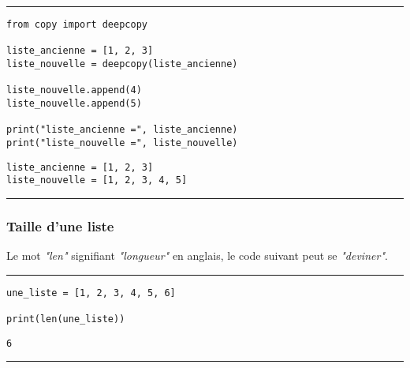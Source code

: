 \bigskip
{\hrule height .5mm}
\begin{verbatim}
from copy import deepcopy

liste_ancienne = [1, 2, 3]
liste_nouvelle = deepcopy(liste_ancienne)

liste_nouvelle.append(4)
liste_nouvelle.append(5)

print("liste_ancienne =", liste_ancienne)
print("liste_nouvelle =", liste_nouvelle)
\end{verbatim}
 \color{ForestGreen}
\vspace{-1.5em}
\begin{verbatim}
liste_ancienne = [1, 2, 3]
liste_nouvelle = [1, 2, 3, 4, 5]
\end{verbatim} \color{Black}
{\hrule height .5mm}
\bigskip


\subsubsection{Taille d'une liste}

Le mot \textit{"len"} signifiant \textit{"longueur"} en anglais, le code suivant peut se \textit{"deviner"}.


\bigskip
{\hrule height .5mm}
\begin{verbatim}
une_liste = [1, 2, 3, 4, 5, 6]

print(len(une_liste))
\end{verbatim}
 \color{ForestGreen}
\vspace{-1.5em}
\begin{verbatim}
6
\end{verbatim} \color{Black}
{\hrule height .5mm}
\bigskip